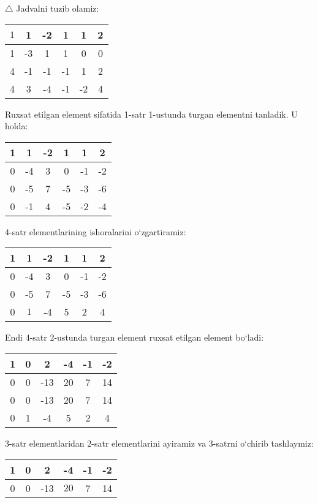 \begin{enumerate}
$\triangle$ Jadvalni tuzib olamiz:
\begin{center}
\begin{tabular}{|c|c|c|c|c|c|}
	\hline
	$\boxed{1}$&1&-2&1&1&2\\ \hline
	1&-3&1&1&0&0\\ \hline
	4&-1&-1&-1&1&2\\ \hline
	4&3&-4&-1&-2&4\\ \hline
\end{tabular}
\end{center}
Ruxsat etilgan element sifatida 1-satr 1-ustunda turgan elementni tanladik. U holda:
\begin{center}
	\begin{tabular}{|c|c|c|c|c|c|}
		\hline
		1&1&-2&1&1&2\\ \hline
		0&-4&3&0&-1&-2\\ \hline
		0&-5&7&-5&-3&-6\\ \hline
		0&-1&4&-5&-2&-4\\ \hline	
	\end{tabular}
\end{center}
4-satr elementlarining ishoralarini o`zgartiramiz:
\begin{center}
	\begin{tabular}{|c|c|c|c|c|c|}
		\hline
		1&1&-2&1&1&2\\ \hline
		0&-4&3&0&-1&-2\\ \hline
		0&-5&7&-5&-3&-6\\ \hline
		0&$\boxed{1}$&-4&5&2&4\\ \hline
	\end{tabular}
\end{center}
Endi 4-satr 2-ustunda turgan element ruxsat etilgan element bo`ladi:
\begin{center}
	\begin{tabular}{|c|c|c|c|c|c|}
		\hline
		1&0&2&-4&-1&-2\\ \hline
		0&0&-13&20&7&14\\ \hline
		0&0&-13&20&7&14\\ \hline
		0&1&-4&5&2&4\\ \hline
	\end{tabular}
\end{center}
3-satr elementlaridan 2-satr elementlarini ayiramiz va 3-satrni o`chirib tashlaymiz:
\begin{center}
	\begin{tabular}{|c|c|c|c|c|c|}
		\hline
		1&0&2&-4&-1&-2\\ \hline
		0&0&-13&$\boxed{20}$&7&14\\ \hline

\end{tabular}
\end{center}
\end{enumerate}
